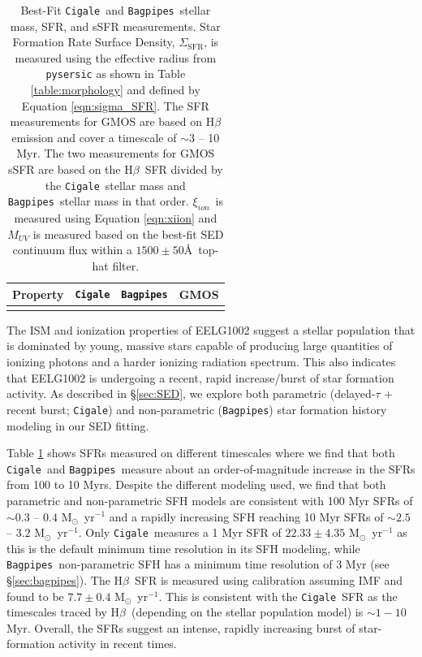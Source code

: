 \documentclass[twocolumn,tight,times,linenumbers]{aastex631}
\newcommand{\hbeta}{H$\beta$}
\newcommand{\msol}{M$_\odot$}
\newcommand{\xiion}{$\xi_{ion}$}
\newcommand{\cigale}{\texttt{Cigale}}
\newcommand{\bagpipes}{\texttt{Bagpipes}}
\begin{document}
		\begin{table}
			\centering
			\caption{Best-Fit \cigale~and \bagpipes~stellar mass, SFR, and sSFR measurements. Star Formation Rate Surface Density, $\Sigma_\textrm{SFR}$, is measured using the effective radius from \texttt{pysersic} as shown in Table \ref{table:morphology} and defined by Equation \ref{eqn:sigma_SFR}. The SFR measurements for GMOS are based on H$\beta$ emission and cover a timescale of $\sim 3$ -- 10 Myr. The two measurements for GMOS sSFR are based on the \hbeta~SFR divided by the \cigale~stellar mass and \bagpipes~stellar mass in that order. \xiion~is measured using Equation \ref{eqn:xiion} and $M_{UV}$ is measured based on the best-fit SED continuum flux within a $1500\pm50$\AA~top-hat filter.}
			\label{table:SED}
			\begin{tabular*}{\textwidth}{@{\extracolsep{\fill}}lccc}
					\hline
					Property & \verb|Cigale| & \verb|Bagpipes| & GMOS \\
					\hline
					\SEDFitProps
					\hline				
			\end{tabular*}
		\end{table}

		The ISM and ionization properties of EELG1002 suggest a stellar population that is dominated by young, massive stars capable of producing large quantities of ionizing photons and a harder ionizing radiation spectrum. This also indicates that EELG1002 is undergoing a recent, rapid increase/burst of star formation activity. As described in \S\ref{sec:SED}, we explore both parametric (delayed-$\tau$ + recent burst; \cigale) and non-parametric (\bagpipes) star formation history modeling in our SED fitting. 
		
		
		Table \ref{table:SED} shows SFRs measured on different timescales where we find that both \cigale~and \bagpipes~measure about an order-of-magnitude increase in the SFRs from 100 to 10 Myrs. Despite the different modeling used, we find that both parametric and non-parametric SFH models are consistent with 100 Myr SFRs of $\sim 0.3$ -- $0.4$ \msol~yr$^{-1}$ and a rapidly increasing SFH reaching 10 Myr SFRs of $\sim 2.5$ -- $3.2$ \msol~yr$^{-1}$. Only \cigale~measures a 1 Myr SFR of $22.33\pm4.35$ \msol~yr$^{-1}$ as this is the default minimum time resolution in its SFH modeling, while \bagpipes~non-parametric SFH has a minimum time resolution of 3 Myr (see \S\ref{sec:bagpipes}). The \hbeta~SFR is measured using \cite{Kennicutt1998} calibration assuming \cite{Chabrier2003} IMF and found to be $7.7\pm0.4$ \msol~yr$^{-1}$. This is consistent with the \cigale~SFR as the timescales traced by \hbeta~(depending on the stellar population model) is $\sim 1 - 10$ Myr. Overall, the SFRs suggest an intense, rapidly increasing burst of star-formation activity in recent times.
		
\end{document}
